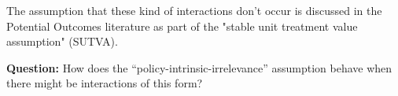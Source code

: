 The assumption that these kind of interactions don't occur is discussed in the Potential Outcomes literature as part of the "stable unit treatment value assumption" (SUTVA).

\textbf{Question: } How does the ``policy-intrinsic-irrelevance'' assumption behave when there might be interactions of this form?












